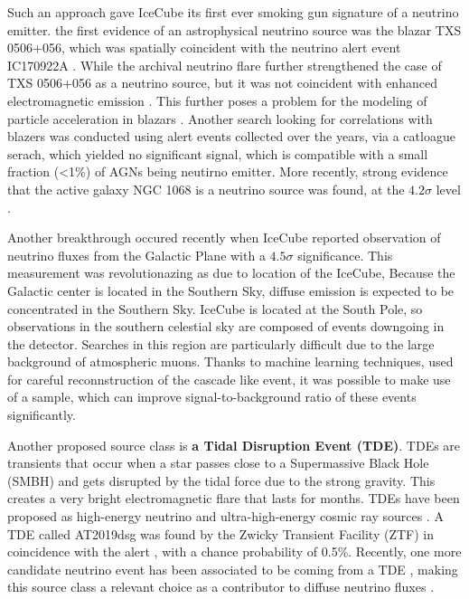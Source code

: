 Such an approach gave IceCube its first ever smoking gun signature of a neutrino emitter. the first evidence of an astrophysical neutrino source was the blazar TXS 0506+056, which was spatially coincident with the neutrino alert event IC170922A . While the archival neutrino flare further strengthened the case of TXS 0506+056 as a neutrino source, but it was not coincident with enhanced electromagnetic emission . This further poses a problem for the modeling of particle acceleration in blazars . Another search looking for correlations with blazers was conducted using alert events collected over the years, via a catloague serach, which yielded no significant signal, which is compatible with a small fraction (<1\%) of AGNs being neutirno emitter. More recently, strong evidence that the active galaxy NGC 1068 is a neutrino source was found, at the $4.2\sigma$ level . 

Another breakthrough occured recently when IceCube reported observation of neutrino fluxes from the Galactic Plane with a $4.5\sigma$ significance. This measurement was revolutionazing as due to location of the IceCube, Because the Galactic center is located in the Southern Sky, diffuse emission is expected to be concentrated in the Southern Sky. IceCube is located at the South Pole, so observations in the southern celestial sky are composed of events downgoing in the detector. Searches in this region are particularly difficult due to the large background of atmospheric muons. Thanks to machine learning techniques, used for careful reconnstruction of the cascade like event, it was possible to make use of a sample, which can improve signal-to-background ratio of these events significantly.

Another proposed source class is \textbf{a Tidal Disruption Event (TDE)}. TDEs are transients that occur when a star passes close to a Supermassive Black Hole (SMBH) and gets disrupted by the tidal force due to the strong gravity. This creates a very bright electromagnetic flare that lasts for months. TDEs have been proposed as high-energy neutrino and ultra-high-energy cosmic ray sources . A TDE called AT2019dsg was found by the Zwicky Transient Facility (ZTF) in coincidence with the alert , with a chance probability of 0.5\%. Recently, one more candidate neutrino event has been associated to be coming from a TDE , making this source class a relevant choice as a contributor to diffuse neutrino fluxes .

